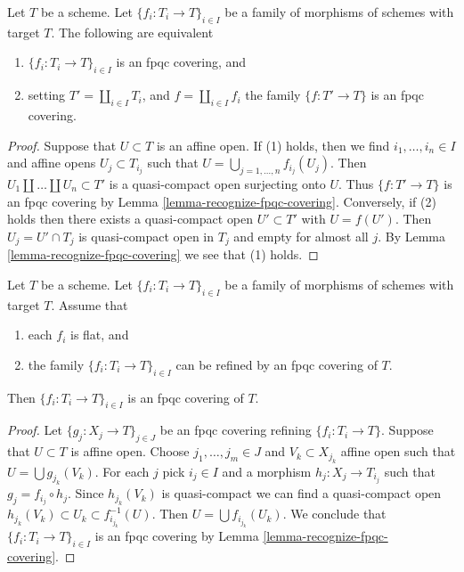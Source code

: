 \begin{lemma}
\label{lemma-disjoint-union-is-fpqc-covering}
Let $T$ be a scheme. Let $\{f_i : T_i \to T\}_{i \in I}$ be a family of
morphisms of schemes with target $T$. The following are equivalent
\begin{enumerate}
\item $\{f_i : T_i \to T\}_{i \in I}$ is an fpqc covering, and
\item setting $T' = \coprod_{i \in I} T_i$, and $f = \coprod_{i \in I} f_i$
the family $\{f : T' \to T\}$ is an fpqc covering.
\end{enumerate}
\end{lemma}

\begin{proof}
Suppose that $U \subset T$ is an affine open. If (1) holds, then we find
$i_1, \ldots, i_n \in I$ and affine opens $U_j \subset T_{i_j}$ such that
$U = \bigcup_{j = 1, \ldots, n} f_{i_j}(U_j)$. Then
$U_1 \amalg \ldots \amalg U_n \subset T'$ is a quasi-compact open surjecting
onto $U$. Thus $\{f : T' \to T\}$ is an fpqc covering by
Lemma \ref{lemma-recognize-fpqc-covering}.
Conversely, if (2) holds then there exists a quasi-compact open
$U' \subset T'$ with $U = f(U')$. Then $U_j = U' \cap T_j$ is quasi-compact
open in $T_j$ and empty for almost all $j$. By
Lemma \ref{lemma-recognize-fpqc-covering} we see that (1) holds.
\end{proof}

\begin{lemma}
\label{lemma-family-flat-dominated-covering}
Let $T$ be a scheme. Let $\{f_i : T_i \to T\}_{i \in I}$ be a family of
morphisms of schemes with target $T$. Assume that
\begin{enumerate}
\item each $f_i$ is flat, and
\item the family $\{f_i : T_i \to T\}_{i \in I}$ can be refined by an
fpqc covering of $T$.
\end{enumerate}
Then $\{f_i : T_i \to T\}_{i \in I}$ is an fpqc covering of $T$.
\end{lemma}

\begin{proof}
Let $\{g_j : X_j \to T\}_{j \in J}$ be an fpqc covering refining
$\{f_i : T_i \to T\}$. Suppose that $U \subset T$ is affine open.
Choose $j_1, \ldots, j_m \in J$ and $V_k \subset X_{j_k}$ affine
open such that $U = \bigcup g_{j_k}(V_k)$. For each $j$ pick $i_j \in I$
and a morphism $h_j : X_j \to T_{i_j}$ such that $g_j = f_{i_j} \circ h_j$.
Since $h_{j_k}(V_k)$ is quasi-compact we can find a quasi-compact
open $h_{j_k}(V_k) \subset U_k \subset f_{i_{j_k}}^{-1}(U)$.
Then $U = \bigcup f_{i_{j_k}}(U_k)$. We conclude that
$\{f_i : T_i \to T\}_{i \in I}$ is an fpqc covering by
Lemma \ref{lemma-recognize-fpqc-covering}.
\end{proof}

